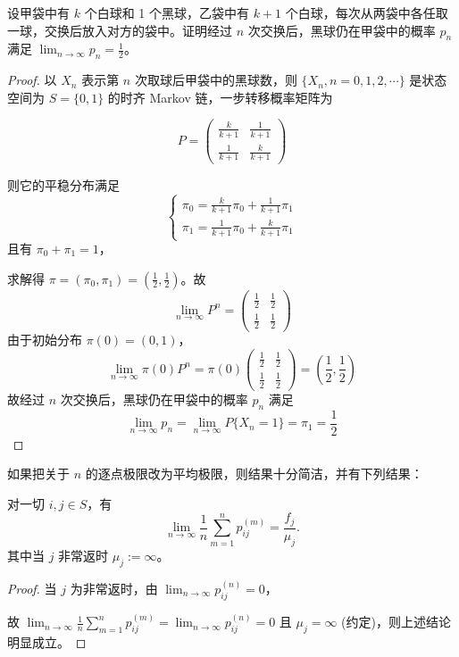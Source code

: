 \documentclass[lang=cn,10pt,thmcnt=section]{elegantbook}
\begin{document}
\begin{example}
	设甲袋中有 $k$ 个白球和 1 个黑球，乙袋中有 $k+1$ 个白球，每次从两袋中各任取一球，交换后放入对方的袋中。证明经过 $n$ 次交换后，黑球仍在甲袋中的概率 $p_n$ 满足 $\lim_{n \to \infty} p_n = \frac{1}{2}$。
\end{example}
\begin{proof}
	以 $X_n$ 表示第 $n$ 次取球后甲袋中的黑球数，则 $\{X_n, n = 0, 1, 2, \cdots\}$ 是状态空间为 $S = \{0, 1\}$ 的时齐 Markov 链，一步转移概率矩阵为

\[
P = \begin{pmatrix}
\frac{k}{k+1} & \frac{1}{k+1} \\
\frac{1}{k+1} & \frac{k}{k+1}
\end{pmatrix}
\]

则它的平稳分布满足
\[
\begin{cases}
\pi_0 = \frac{k}{k+1} \pi_0 + \frac{1}{k+1} \pi_1 \\
\pi_1 = \frac{1}{k+1} \pi_0 + \frac{k}{k+1} \pi_1
\end{cases}
\]
且有 $\pi_0 + \pi_1 = 1$，

求解得 $\pi = (\pi_0, \pi_1) = \left(\frac{1}{2}, \frac{1}{2}\right)$。故
\[
\lim_{n \to \infty} P^n = \begin{pmatrix}
\frac{1}{2} & \frac{1}{2} \\
\frac{1}{2} & \frac{1}{2}
\end{pmatrix}
\]
由于初始分布 $\pi(0) = (0, 1)$，
\[
\lim_{n \to \infty} \pi(0) P^n = \pi(0) \begin{pmatrix}
\frac{1}{2} & \frac{1}{2} \\
\frac{1}{2} & \frac{1}{2}
\end{pmatrix} = \left(\frac{1}{2}, \frac{1}{2}\right)
\]
故经过 $n$ 次交换后，黑球仍在甲袋中的概率 $p_n$ 满足
\[
\lim_{n \to \infty} p_n = \lim_{n \to \infty} P\{X_n = 1\} = \pi_1 = \frac{1}{2}
\]

\end{proof}
如果把关于 $n$ 的逐点极限改为平均极限，则结果十分简洁，并有下列结果：
\begin{theorem}
	对一切 $i, j \in S$，有
\[
\lim_{n \to \infty} \frac{1}{n} \sum_{m=1}^{n} p_{ij}^{(m)} = \frac{f_j}{\mu_j}.
\]
其中当 $j$ 非常返时 $\mu_j := \infty$。

\end{theorem}
\begin{proof}
	当 $j$ 为非常返时，由 $\lim_{n \to \infty} p_{ij}^{(n)} = 0$，

故 $\lim_{n \to \infty} \frac{1}{n} \sum_{m=1}^{n} p_{ij}^{(m)} = \lim_{n \to \infty} p_{ij}^{(n)} = 0$ 且 $\mu_j = \infty$ (约定)，则上述结论明显成立。

\end{proof}
\end{document}
